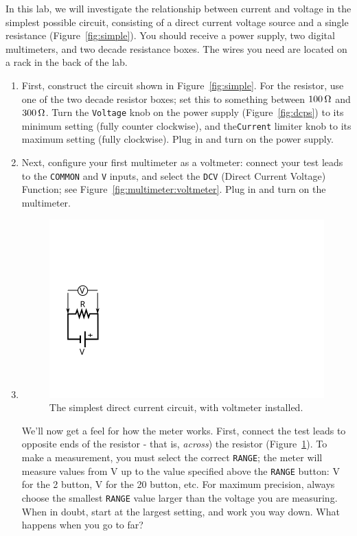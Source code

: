 \documentclass[12pt]{article}
\begin{document}
In this lab, we will investigate the relationship between current and
voltage in the simplest possible circuit, consisting of a direct
current voltage source and a single resistance
(Figure~\ref{fig:simple}).  You should receive a power supply, two
digital multimeters, and two decade resistance boxes.  The wires you
need are located on a rack in the back of the lab.
\begin{enumerate}
\item First, construct the circuit shown in Figure~\ref{fig:simple}.
  For the resistor, use one of the two decade resistor boxes; set this
  to something between $\unit[100]{\Omega}$ and $\unit[300]{\Omega}$.
  Turn the \texttt{Voltage} knob on the power supply
  (Figure~\ref{fig:dcps}) to its minimum setting (fully counter
  clockwise), and the\texttt{Current} limiter knob to its maximum
  setting (fully clockwise).  Plug in and turn on the power supply.
\item Next, configure your first multimeter as a voltmeter: connect
  your test leads to the \texttt{COMMON} and \texttt{V} inputs, and
  select the \texttt{DCV} (Direct Current Voltage) Function; see
  Figure~\ref{fig:multimeter:voltmeter}.  Plug in and turn on the
  multimeter.
\item 
  \begin{figure}
    \centering
    \includegraphics[width=\textwidth/5]{figures/simplest_with_voltmeter}
    \caption{The simplest direct current circuit, with voltmeter installed.}
    \label{fig:simplest_with_voltmeter}
  \end{figure}
  We'll now get a feel for how the meter works.  First, connect the
  test leads to opposite ends of the resistor - that is,
  \textit{across}) the resistor
  (Figure~\ref{fig:simplest_with_voltmeter}).  To make a measurement,
  you must select the correct \texttt{RANGE}; the meter will measure
  values from \unit[0]{V} up to the value specified above the
  \texttt{RANGE} button: \unit[2]{V} for the 2 button, \unit[20]{V}
  for the 20 button, etc.  For maximum precision, always choose the
  smallest \texttt{RANGE} value larger than the voltage you are
  measuring.  When in doubt, start at the largest setting, and work
  you way down.  What happens when you go to far?


\end{enumerate}
\end{document}
